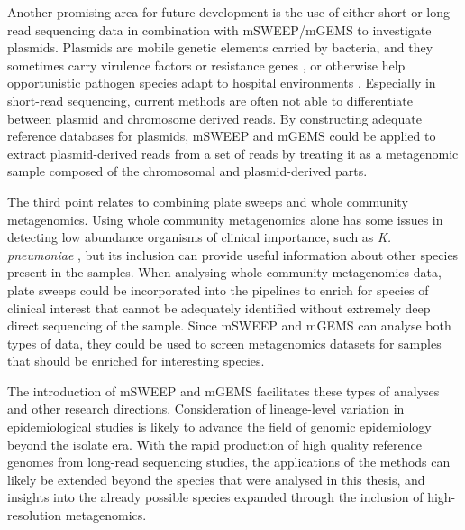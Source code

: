 \documentclass[officiallayout]{tktla}
\begin{document}
Another promising area for future development is the use of either
short or long-read sequencing data in combination with mSWEEP/mGEMS to
investigate plasmids. Plasmids are mobile genetic elements carried by
bacteria, and they sometimes carry virulence factors or resistance
genes \citep{wyres2016klebsiella, denamur2021population,
  palmer2010horizontal}, or otherwise help opportunistic pathogen
species adapt to hospital environments
\citep{arredondo2020plasmids}. Especially in short-read sequencing,
current methods are often not able to differentiate between plasmid
and chromosome derived reads. By constructing adequate reference
databases for plasmids, mSWEEP and mGEMS could be applied to extract
plasmid-derived reads from a set of reads by treating it as a
metagenomic sample composed of the chromosomal and plasmid-derived
parts.

The third point relates to combining plate sweeps and whole community
metagenomics. Using whole community metagenomics alone has some issues in
detecting low abundance organisms of clinical importance, such as
\textit{K. pneumoniae} \citep{gorrie2017gastrointestinal,
  martin2016molecular}, but its inclusion can provide useful
information about other species present in the samples. When analysing
whole community metagenomics data, plate sweeps could be incorporated into the
pipelines to enrich for species of clinical interest that cannot be
adequately identified without extremely deep direct sequencing of the
sample. Since mSWEEP and mGEMS can analyse both types of data, they
could be used to screen metagenomics datasets for samples that should
be enriched for interesting species.

The introduction of mSWEEP and mGEMS facilitates these types of
analyses and other research directions. Consideration of lineage-level
variation in epidemiological studies is likely to advance the field of
genomic epidemiology beyond the isolate era. With the rapid production
of high quality reference genomes from long-read sequencing studies,
the applications of the methods can likely be extended beyond the
species that were analysed in this thesis, and insights into the
already possible species expanded through the inclusion of
high-resolution metagenomics.

\printbibliography[heading=bibintoc,title=References]



\newpage
\thispagestyle{empty}
\mbox{}
\newpage


\end{document}
